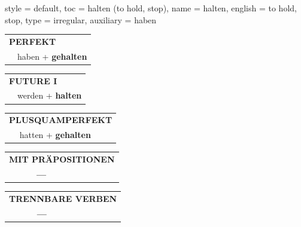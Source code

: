 \begin{verbentry}{
  style = {default},
  toc = {halten (to hold, stop)},
  name = {halten},
  english = {to hold, stop},
  type = {irregular},
  auxiliary = {haben}
}
 \begin{tabular}{rl}
     \multicolumn{2}{l}{\textbf{PERFEKT}}\\
  &  haben + \textbf{gehalten}\\
  \end{tabular}
\hfill
   \begin{tabular}{rl}
   
    \multicolumn{2}{l}{\textbf{FUTURE I} }\\
   & werden + \textbf{halten}\\
 
  \end{tabular}
\hfill
   \begin{tabular}{rl}
      \multicolumn{2}{l}{\textbf{PLUSQUAMPERFEKT}}\\
   & hatten + \textbf{gehalten}\\
  \end{tabular}
  
  \vspace{10pt}



\begin{tabular}{lll}
\multicolumn{3}{l}{\textbf{MIT PRÄPOSITIONEN}}\\
& \textbf{---} & \\
\end{tabular}
\hfill
\begin{tabular}{lll}
\multicolumn{3}{l}{\textbf{TRENNBARE VERBEN}}\\
& \textbf{---} & \\
\end{tabular}

  \vspace{-5pt}
\end{verbentry}

